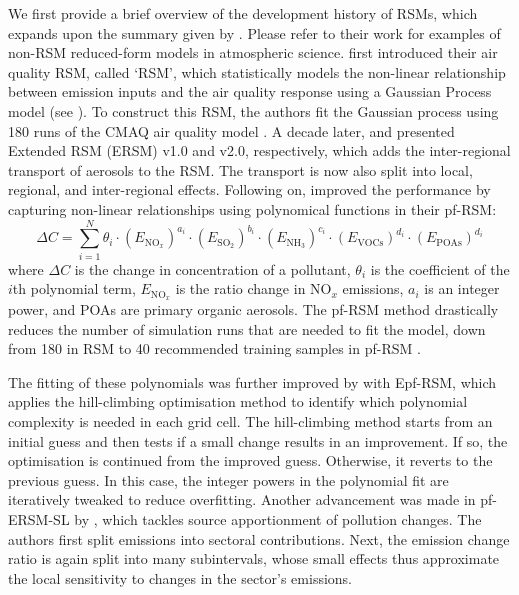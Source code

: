 We first provide a brief overview of the development history of RSMs, which expands upon the summary given by \textcite{emission-rsm-2022}. Please refer to their work for examples of non-RSM reduced-form models in atmospheric science. \textcite{rsm-epa-2006} first introduced their air quality RSM, called `RSM', which statistically models the non-linear relationship between emission inputs and the air quality response using a Gaussian Process model (see ). To construct this RSM, the authors fit the Gaussian process using 180 runs of the CMAQ air quality model \cite{cmaq-2006}. A decade later, \textcite{ersm-v1-2015} and \textcite{ersm-v2-2017} presented Extended RSM (ERSM) v1.0 and v2.0, respectively, which adds the inter-regional transport of aerosols to the RSM. The transport is now also split into local, regional, and inter-regional effects. Following on, \textcite{pf-rsm-2018} improved the performance by capturing non-linear relationships using polynomical functions in their pf-RSM:
\begin{equation*}
    \Delta C = \sum_{i=1}^{N} \theta_i \cdot (E_{\text{NO}_{x}})^{a_i} \cdot (E_{\text{SO}_2})^{b_i} \cdot (E_{\text{NH}_3})^{c_i} \cdot (E_{\text{VOCs}})^{d_i} \cdot (E_{\text{POAs}})^{d_i}
\end{equation*}
where $\Delta C$ is the change in concentration of a pollutant, $\theta_i$ is the coefficient of the $i$th polynomial term, $E_{\text{NO}_{x}}$ is the ratio change in $\text{NO}_{x}$ emissions, $a_i$ is an integer power, and POAs are primary organic aerosols. The pf-RSM method drastically reduces the number of simulation runs that are needed to fit the model, down from 180 in RSM \cite{rsm-epa-2006} to 40 recommended training samples in pf-RSM \cite{pf-rsm-2018}.

The fitting of these polynomials was further improved by \textcite{epf-rsm-2020} with Epf-RSM, which applies the hill-climbing optimisation method \cite{hill-climbing-2004} to identify which polynomial complexity is needed in each grid cell. The hill-climbing method starts from an initial guess and then tests if a small change results in an improvement. If so, the optimisation is continued from the improved guess. Otherwise, it reverts to the previous guess. In this case, the integer powers in the polynomial fit are iteratively tweaked to reduce overfitting. Another advancement was made in pf-ERSM-SL by \textcite{pf-ersm-sl-2020}, which tackles source apportionment of pollution changes. The authors first split emissions into sectoral contributions. Next, the emission change ratio is again split into many subintervals, whose small effects thus approximate the local sensitivity to changes in the sector's emissions.

